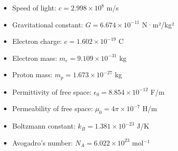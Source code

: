 \documentclass[11pt]{article}
\theoremstyle{definition}
\begin{document}
\begin{itemize}
    \item Speed of light: $c = 2.998 \times 10^8$ m/s
    \item Gravitational constant: $G = 6.674 \times 10^{-11}$ N·m²/kg²
    \item Electron charge: $e = 1.602 \times 10^{-19}$ C
    \item Electron mass: $m_e = 9.109 \times 10^{-31}$ kg
    \item Proton mass: $m_p = 1.673 \times 10^{-27}$ kg
    \item Permittivity of free space: $\epsilon_0 = 8.854 \times 10^{-12}$ F/m
    \item Permeability of free space: $\mu_0 = 4\pi \times 10^{-7}$ H/m
    \item Boltzmann constant: $k_B = 1.381 \times 10^{-23}$ J/K
    \item Avogadro's number: $N_A = 6.022 \times 10^{23}$ mol$^{-1}$
\end{itemize}
\end{document}
